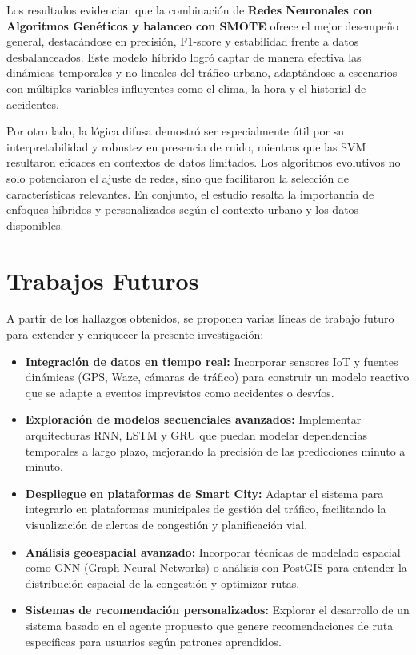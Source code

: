 \documentclass{svproc} %
\begin{document}
Los resultados evidencian que la combinación de \textbf{Redes Neuronales con Algoritmos Genéticos y balanceo con SMOTE} ofrece el mejor desempeño general, destacándose en precisión, F1-score y estabilidad frente a datos desbalanceados. Este modelo híbrido logró captar de manera efectiva las dinámicas temporales y no lineales del tráfico urbano, adaptándose a escenarios con múltiples variables influyentes como el clima, la hora y el historial de accidentes.

Por otro lado, la lógica difusa demostró ser especialmente útil por su interpretabilidad y robustez en presencia de ruido, mientras que las SVM resultaron eficaces en contextos de datos limitados. Los algoritmos evolutivos no solo potenciaron el ajuste de redes, sino que facilitaron la selección de características relevantes. En conjunto, el estudio resalta la importancia de enfoques híbridos y personalizados según el contexto urbano y los datos disponibles.

\section{Trabajos Futuros}

A partir de los hallazgos obtenidos, se proponen varias líneas de trabajo futuro para extender y enriquecer la presente investigación:

\begin{itemize}
    \item \textbf{Integración de datos en tiempo real:} Incorporar sensores IoT y fuentes dinámicas (GPS, Waze, cámaras de tráfico) para construir un modelo reactivo que se adapte a eventos imprevistos como accidentes o desvíos.
    
    \item \textbf{Exploración de modelos secuenciales avanzados:} Implementar arquitecturas RNN, LSTM y GRU que puedan modelar dependencias temporales a largo plazo, mejorando la precisión de las predicciones minuto a minuto.
    
    \item \textbf{Despliegue en plataformas de Smart City:} Adaptar el sistema para integrarlo en plataformas municipales de gestión del tráfico, facilitando la visualización de alertas de congestión y planificación vial.
    
    \item \textbf{Análisis geoespacial avanzado:} Incorporar técnicas de modelado espacial como GNN (Graph Neural Networks) o análisis con PostGIS para entender la distribución espacial de la congestión y optimizar rutas.
    
    \item \textbf{Sistemas de recomendación personalizados:} Explorar el desarrollo de un sistema basado en el agente propuesto que genere recomendaciones de ruta específicas para usuarios según patrones aprendidos.
\end{itemize}
\end{document}
